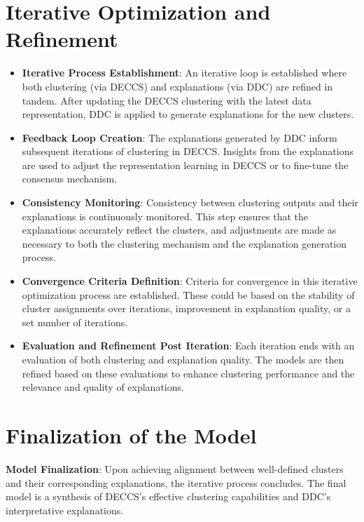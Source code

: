 \section{Iterative Optimization and Refinement}
\begin{itemize}
    \item \textbf{Iterative Process Establishment}: An iterative loop is established where both clustering (via DECCS) and explanations (via DDC) are refined in tandem. After updating the DECCS clustering with the latest data representation, DDC is applied to generate explanations for the new clusters.
    \item \textbf{Feedback Loop Creation}: The explanations generated by DDC inform subsequent iterations of clustering in DECCS. Insights from the explanations are used to adjust the representation learning in DECCS or to fine-tune the consensus mechanism.
    \item \textbf{Consistency Monitoring}: Consistency between clustering outputs and their explanations is continuously monitored. This step ensures that the explanations accurately reflect the clusters, and adjustments are made as necessary to both the clustering mechanism and the explanation generation process.
    \item \textbf{Convergence Criteria Definition}: Criteria for convergence in this iterative optimization process are established. These could be based on the stability of cluster assignments over iterations, improvement in explanation quality, or a set number of iterations.
    \item \textbf{Evaluation and Refinement Post Iteration}: Each iteration ends with an evaluation of both clustering and explanation quality. The models are then refined based on these evaluations to enhance clustering performance and the relevance and quality of explanations.
\end{itemize}

\section{Finalization of the Model}
\textbf{Model Finalization}: Upon achieving alignment between well-defined clusters and their corresponding explanations, the iterative process concludes. The final model is a synthesis of DECCS’s effective clustering capabilities and DDC’s interpretative explanations.


